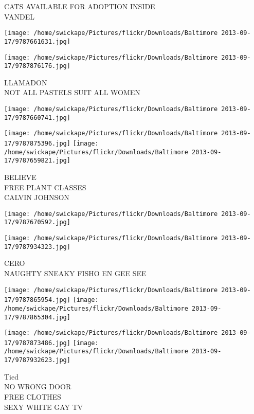 \documentclass[10pt,letterpaper]{article}
\begin{document}
CATS AVAILABLE FOR ADOPTION INSIDE\\
VANDEL\\
\pagebreak

\texttt{[image: /home/swickape/Pictures/flickr/Downloads/Baltimore 2013-09-17/9787661631.jpg]}

\vspace{0.25in}
\texttt{[image: /home/swickape/Pictures/flickr/Downloads/Baltimore 2013-09-17/9787876176.jpg]}

LLAMADON\\
NOT ALL PASTELS SUIT ALL WOMEN\\
\pagebreak

\texttt{[image: /home/swickape/Pictures/flickr/Downloads/Baltimore 2013-09-17/9787660741.jpg]}

\vspace{0.25in}
\texttt{[image: /home/swickape/Pictures/flickr/Downloads/Baltimore 2013-09-17/9787875396.jpg]}
\texttt{[image: /home/swickape/Pictures/flickr/Downloads/Baltimore 2013-09-17/9787659821.jpg]}

BELIEVE\\
FREE PLANT CLASSES\\
CALVIN JOHNSON\\
\pagebreak

\texttt{[image: /home/swickape/Pictures/flickr/Downloads/Baltimore 2013-09-17/9787670592.jpg]}

\vspace{0.25in}
\texttt{[image: /home/swickape/Pictures/flickr/Downloads/Baltimore 2013-09-17/9787934323.jpg]}

CERO\\
NAUGHTY SNEAKY FISHO EN GEE SEE\\
\pagebreak

\texttt{[image: /home/swickape/Pictures/flickr/Downloads/Baltimore 2013-09-17/9787865954.jpg]}
\texttt{[image: /home/swickape/Pictures/flickr/Downloads/Baltimore 2013-09-17/9787865304.jpg]}

\texttt{[image: /home/swickape/Pictures/flickr/Downloads/Baltimore 2013-09-17/9787873486.jpg]}
\texttt{[image: /home/swickape/Pictures/flickr/Downloads/Baltimore 2013-09-17/9787932623.jpg]}

Tied\\
NO WRONG DOOR\\
FREE CLOTHES\\
SEXY WHITE GAY TV\\
\pagebreak
\end{document}
